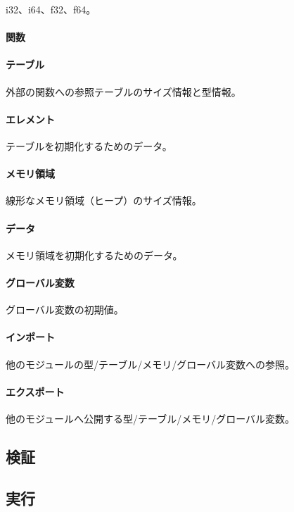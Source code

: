 i32、i64、f32、f64。

\paragraph{関数}

\paragraph{テーブル}

外部の関数への参照テーブルのサイズ情報と型情報。

\paragraph{エレメント}

テーブルを初期化するためのデータ。

\paragraph{メモリ領域}

線形なメモリ領域（ヒープ）のサイズ情報。

\paragraph{データ}

メモリ領域を初期化するためのデータ。

\paragraph{グローバル変数}

グローバル変数の初期値。

\paragraph{インポート}

他のモジュールの型/テーブル/メモリ/グローバル変数への参照。

\paragraph{エクスポート}

他のモジュールへ公開する型/テーブル/メモリ/グローバル変数。

\subsection{検証}

\subsection{実行}
